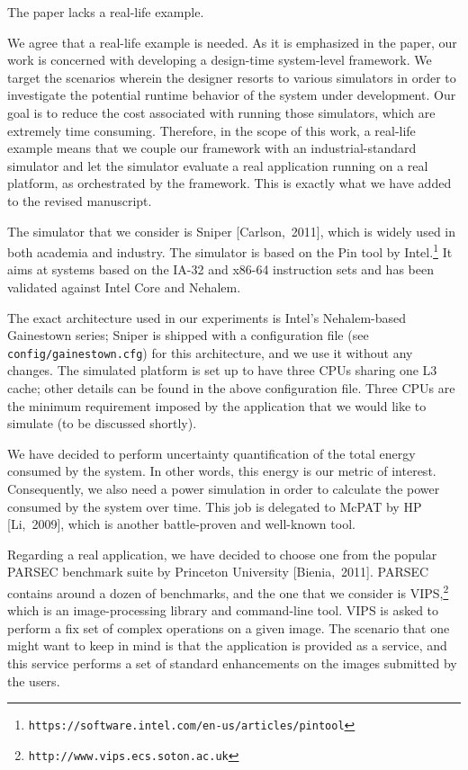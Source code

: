 \begin{reviewer}
 The paper lacks a real-life example.
\end{reviewer}

\begin{authors}
We agree that a real-life example is needed. As it is emphasized in the paper,
our work is concerned with developing a design-time system-level framework. We
target the scenarios wherein the designer resorts to various simulators in order
to investigate the potential runtime behavior of the system under development.
Our goal is to reduce the cost associated with running those simulators, which
are extremely time consuming. Therefore, in the scope of this work, a real-life
example means that we couple our framework with an industrial-standard simulator
and let the simulator evaluate a real application running on a real platform, as
orchestrated by the framework. This is exactly what we have added to the revised
manuscript.

The simulator that we consider is Sniper [Carlson,~2011], which is widely used
in both academia and industry. The simulator is based on the Pin tool by
Intel.\footnote{\texttt{https://software.intel.com/en-us/articles/pintool}} It
aims at systems based on the IA-32 and x86-64 instruction sets and has been
validated against Intel Core and Nehalem.

The exact architecture used in our experiments is Intel's Nehalem-based
Gainestown series; Sniper is shipped with a configuration file (see
\texttt{config/gainestown.cfg}) for this architecture, and we use it without any
changes. The simulated platform is set up to have three CPUs sharing one L3
cache; other details can be found in the above configuration file. Three CPUs
are the minimum requirement imposed by the application that we would like to
simulate (to be discussed shortly).

We have decided to perform uncertainty quantification of the total energy
consumed by the system. In other words, this energy is our metric of interest.
Consequently, we also need a power simulation in order to calculate the power
consumed by the system over time. This job is delegated to McPAT by HP
[Li,~2009], which is another battle-proven and well-known tool.

Regarding a real application, we have decided to choose one from the popular
PARSEC benchmark suite by Princeton University [Bienia,~2011]. PARSEC contains
around a dozen of benchmarks, and the one that we consider is
VIPS,\footnote{\texttt{http://www.vips.ecs.soton.ac.uk}} which is an
image-processing library and command-line tool. VIPS is asked to perform a fix
set of complex operations on a given image. The scenario that one might want to
keep in mind is that the application is provided as a service, and this service
performs a set of standard enhancements on the images submitted by the users.


\end{authors}
